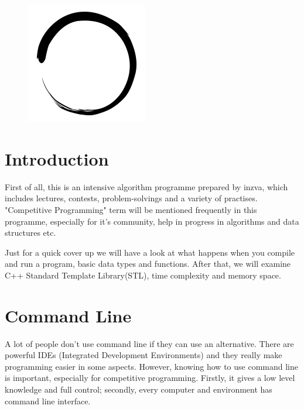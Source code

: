 \documentclass[12pt]{article}
\title{\vspace{-2em}\mytitle\vspace{-0.3em}}
\author{\textbf{Editor}\\Muhammed Burak Bu\u{g}rul\\ \ \\ \textbf{Reviewers} \\ Kadir Emre Oto\\Yusuf Hakan Kalayc{\i}}
\date{}
\begin{document}
\begin{figure}
  \centering
  \includegraphics[width=\linewidth/4]{inzva-logo.png}
  \label{fig:inzva}
\end{figure}
\maketitle

\cleardoublepage
\tableofcontents
{}
\cleardoublepage

\section{Introduction}
First of all, this is an intensive algorithm programme prepared by inzva, which includes lectures, contests, problem-solvings and a variety of practises. "Competitive Programming" term will be mentioned frequently in this programme, especially for it's community, help in progress in algorithms and data structures etc. 

Just for a quick cover up we will have a look at what happens when you compile and run a program, basic data types and functions. After that, we will examine C++ Standard Template Library(STL), time complexity and memory space.

\section{Command Line}
A lot of people don't use command line if they can use an alternative. There are powerful IDEs (Integrated Development Environments) and they really make programming easier in some aspects. However, knowing how to use command line is important, especially for competitive programming. Firstly, it gives a low level knowledge and full control; secondly, every computer and environment has command line interface.
\end{document}
